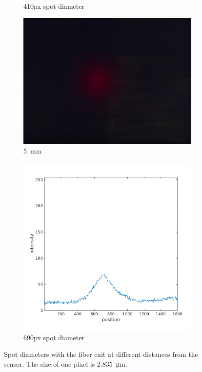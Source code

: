 \documentclass[a4paper, 12pt]{paper}
\begin{document}
\begin{figure}[H]
\begin{subfigure}[t]{0.4\textwidth}
        \caption{410px spot diameter}
    \end{subfigure}
    \begin{subfigure}[t]{0.5\textwidth}
        \includegraphics[width=\textwidth]{img/5mm.jpg}
        \caption{\SI{5}{\milli\meter}}
    \end{subfigure}
    \begin{subfigure}[t]{0.4\textwidth}
        \includegraphics[width=\textwidth]{img/5mm_line}
        \caption{690px spot diameter}
\label{fig:5mm}
    \end{subfigure}
    \caption{Spot diameters with the fiber exit at different distances from the sensor.
        The size of one pixel is \SI{2.835}{\micro\meter}.}
\label{fig:spot_diams}
\end{figure}
\end{document}
